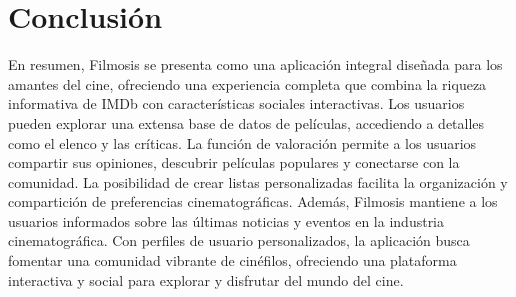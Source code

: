 \documentclass{article}
\begin{document}
\newpage

\section{Conclusión}

En resumen, Filmosis se presenta como una aplicación integral diseñada para los amantes del cine, ofreciendo una experiencia completa que combina la riqueza informativa de IMDb con características sociales interactivas. Los usuarios pueden explorar una extensa base de datos de películas, accediendo a detalles como el elenco y las críticas. La función de valoración permite a los usuarios compartir sus opiniones, descubrir películas populares y conectarse con la comunidad. La posibilidad de crear listas personalizadas facilita la organización y compartición de preferencias cinematográficas. Además, Filmosis mantiene a los usuarios informados sobre las últimas noticias y eventos en la industria cinematográfica. Con perfiles de usuario personalizados, la aplicación busca fomentar una comunidad vibrante de cinéfilos, ofreciendo una plataforma interactiva y social para explorar y disfrutar del mundo del cine.
\end{document}

